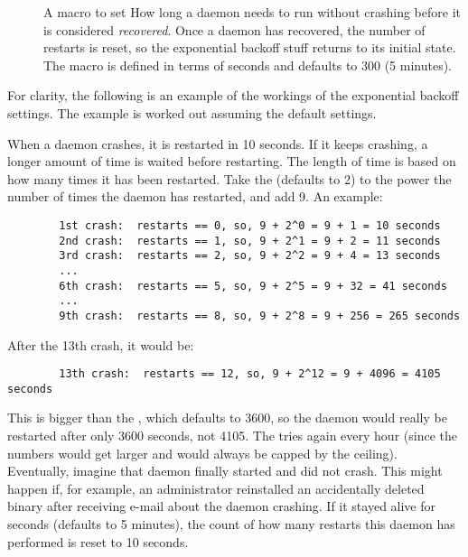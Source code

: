\begin{description}
\item[]
  \label{param:MasterRecoverFactor}  A macro to set How long a daemon 
  needs to run without crashing before it is considered \emph{recovered}.
  Once a
  daemon has recovered, the number of restarts is reset, so the
  exponential backoff stuff returns to its initial state.  
  The macro is defined in
  terms of seconds and defaults to 300 (5 minutes).

\end{description}

For clarity, the following is an example of the workings of
the exponential backoff settings.  The example is worked out assuming
the default settings.

When a daemon crashes, it is restarted in 10 seconds.  If it keeps
crashing, a longer amount of time is waited before restarting.
The length of time is based on how
many times it has been restarted.  
Take the  (defaults to 2) to 
the power the number of times the daemon has restarted, and add 9.
An example:
\begin{verbatim}
        1st crash:  restarts == 0, so, 9 + 2^0 = 9 + 1 = 10 seconds
        2nd crash:  restarts == 1, so, 9 + 2^1 = 9 + 2 = 11 seconds
        3rd crash:  restarts == 2, so, 9 + 2^2 = 9 + 4 = 13 seconds
        ...
        6th crash:  restarts == 5, so, 9 + 2^5 = 9 + 32 = 41 seconds
        ...
        9th crash:  restarts == 8, so, 9 + 2^8 = 9 + 256 = 265 seconds
\end{verbatim}

After the 13th crash, it would be:
\begin{verbatim}
        13th crash:  restarts == 12, so, 9 + 2^12 = 9 + 4096 = 4105 seconds
\end{verbatim}

This is bigger than the , which
defaults to 3600, so the daemon would really be restarted after only
3600 seconds, not 4105.
The  tries again every hour (since the numbers would
get larger and would always be capped by the ceiling).
Eventually, imagine that daemon finally started and did not crash.
This might happen if, for example, an administrator reinstalled
an accidentally deleted binary after receiving e-mail about
the daemon crashing.
If it stayed alive for
 seconds (defaults to 5 minutes),
the count of how many restarts this daemon has performed is reset to
10 seconds.

